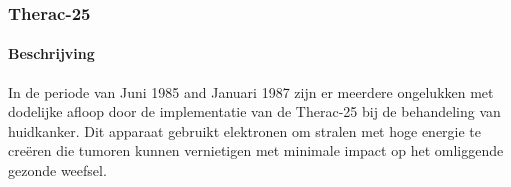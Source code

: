 \documentclass{article}
\begin{document}
	
	\subsubsection{Therac-25}
	\paragraph{Beschrijving}
	In de periode van Juni 1985 and Januari 1987 zijn er meerdere ongelukken met dodelijke afloop door de implementatie van de Therac-25 bij de behandeling van huidkanker.
	Dit apparaat gebruikt elektronen om stralen met hoge energie te creëren die tumoren kunnen vernietigen met minimale impact op het omliggende gezonde weefsel.
	
\end{document}
